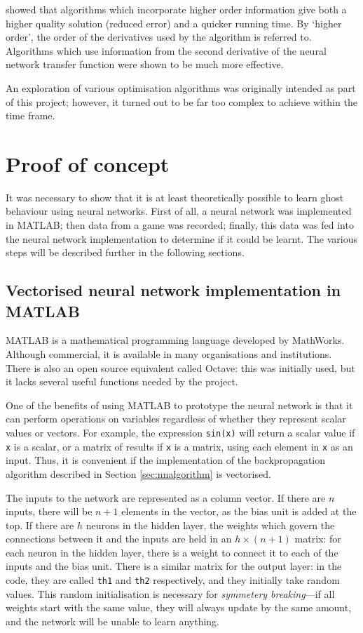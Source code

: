 \citet{Groot1994} showed that algorithms which incorporate higher order information give both a higher quality solution (reduced error) and a quicker running time.  By `higher order', the order of the derivatives used by the algorithm is referred to.  Algorithms which use information from the second derivative of the neural network transfer function were shown to be much more effective.

An exploration of various optimisation algorithms was originally intended as part of this project; however, it turned out to be far too complex to achieve within the time frame.

\section{Proof of concept}

It was necessary to show that it is at least theoretically possible to learn ghost behaviour using neural networks.  First of all, a neural network was implemented in MATLAB; then data from a game was recorded; finally, this data was fed into the neural network implementation to determine if it could be learnt.  The various steps will be described further in the following sections.

\subsection{Vectorised neural network implementation in MATLAB}
\label{sec:matlab}

MATLAB is a mathematical programming language developed by MathWorks.  Although commercial, it is available in many organisations and institutions.  There is also an open source equivalent called Octave: this was initially used, but it lacks several useful functions needed by the project.

One of the benefits of using MATLAB to prototype the neural network is that it can perform operations on variables regardless of whether they represent scalar values or vectors.  For example, the expression {\tt sin(x)} will return a scalar value if {\tt x} is a scalar, or a matrix of results if {\tt x} is a matrix, using each element in {\tt x} as an input.  Thus, it is convenient if the implementation of the backpropagation algorithm described in Section \ref{sec:nnalgorithm} is vectorised.

The inputs to the network are represented as a column vector.  If there are $n$ inputs, there will be $n + 1$ elements in the vector, as the bias unit is added at the top.  If there are $h$ neurons in the hidden layer, the weights which govern the connections between it and the inputs are held in an $h \times (n + 1)$ matrix: for each neuron in the hidden layer, there is a weight to connect it to each of the inputs and the bias unit.  There is a similar matrix for the output layer: in the code, they are called {\tt th1} and {\tt th2} respectively, and they initially take random values.  This random initialisation is necessary for \emph{symmetery breaking}---if all weights start with the same value, they will always update by the same amount, and the network will be unable to learn anything.

